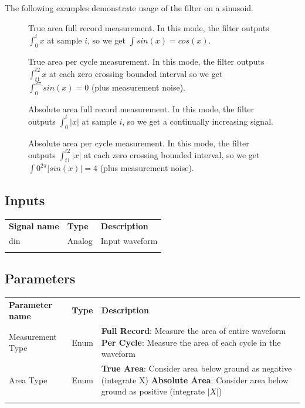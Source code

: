 The following examples demonstrate usage of the filter on a sinusoid.

\begin{figure}[h]
\centering
{}
\caption{True area full record measurement. In this mode, the filter outputs $\int_{0}^{i} x$ at sample $i$, so we get
$\int sin(x) = cos(x)$.}
\end{figure}

\begin{figure}[h]
\centering
{}
\caption{True area per cycle measurement. In this mode, the filter outputs $\int_{t1}^{t2} x$ at each zero
crossing bounded interval so we get $\int_{0}^{2\pi} sin(x) = 0$ (plus measurement noise).}
\end{figure}

\begin{figure}[h]
\centering
{}
\caption{Absolute area full record measurement. In this mode, the filter outputs $\int_{0}^{i} |x|$ at sample $i$, so
we get a continually increasing signal.}
\end{figure}

\begin{figure}[h]
\centering
{}
\caption{Absolute area per cycle measurement. In this mode, the filter outputs $\int_{t1}^{t2} |x|$ at each zero
crossing bounded interval, so we get $\int{0}^{2\pi} |sin(x)| = 4$ (plus measurement noise).}
\end{figure}

\subsection{Inputs}

\begin{tabularx}{16cm}{llX}
\thickhline
\textbf{Signal name} & \textbf{Type} & \textbf{Description} \\
\thickhline
din & Analog & Input waveform \\
\thickhline
\end{tabularx}

\subsection{Parameters}

\begin{tabularx}{16cm}{llX}
\thickhline
\textbf{Parameter name} & \textbf{Type} & \textbf{Description} \\
\thickhline
Measurement Type & Enum &
	\textbf{Full Record}: Measure the area of entire waveform \newline
	\textbf{Per Cycle}: Measure the area of each cycle in the waveform\\
\thinhline
Area Type & Enum &
	\textbf{True Area}: Consider area below ground as negative (integrate X)\newline
	\textbf{Absolute Area}: Consider area below ground as positive (integrate $|X|$)\\
\thickhline
\end{tabularx}

